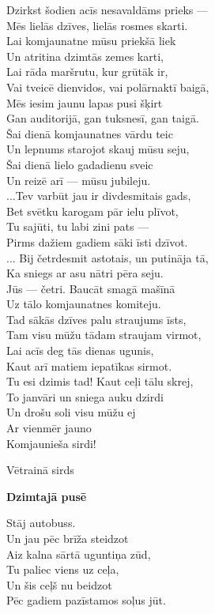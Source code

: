 \documentclass[14pt]{extarticle}
\begin{document}
{{Dzirkst šodien acīs nesavaldāms prieks ---\\
Mēs lielās dzīves, lielās rosmes skarti.\\
Lai komjaunatne mūsu priekšā liek\\
Un atritina dzimtās zemes karti,\\
Lai rāda maršrutu, kur grūtāk ir,\\
Vai tveicē dienvidos, vai polārnaktī baigā,\\
Mēs iesim jaunu lapas pusi šķirt\\
Gan auditorijā, gan tuksnesī, gan taigā.\\
Šai dienā komjaunatnes vārdu teic\\
Un lepnums starojot skauj mūsu seju,\\
Šai dienā lielo gadadienu sveic\\
Un reizē arī --- mūsu jubileju.\\
...Tev varbūt jau ir divdesmitais gads,\\
Bet svētku karogam pār ielu plīvot,\\
Tu sajūti, tu labi zini pats ---\\
Pirms dažiem gadiem sāki īsti dzīvot.\\
... Bij četrdesmit astotais, un putināja tā,\\
Ka sniegs ar asu nātri pēra seju.\\
Jūs --- četri. Baucāt smagā mašīnā\\
Uz tālo komjaunatnes komiteju.\\
\mbox{}\hspace{10pt}Tad sākās dzīves palu straujums īsts,\\
Tam visu mūžu tādam straujam virmot,\\
Lai acīs deg tās dienas ugunis,\\
Kaut arī matiem iepatīkas sirmot.\\
Tu esi dzimis tad! Kaut ceļi tālu skrej,\\
To janvāri un sniega auku dzirdi\\
Un drošu soli visu mūžu ej\\
Ar vienmēr jauno\\
Komjaunieša sirdi!


\newpage 

{\large \sc Vētrainā sirds}

{\bf Dzimtajā pusē}

Stāj autobuss.\\
Un jau pēc brīža steidzot\\
Aiz kalna sārtā uguntiņa zūd,\\
Tu paliec viens uz ceļa,\\
Un šis ceļš nu beidzot\\
Pēc gadiem pazīstamos soļus jūt. 

}}
\end{document}
